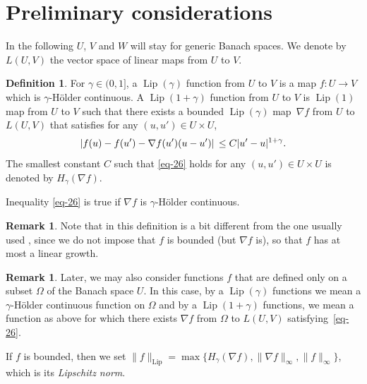 \documentclass[a4paper,12pt]{article}
\theoremstyle{definition}
\newtheorem{definition}{Definition}
\newtheorem{remark}[theorem]{Remark}
\DeclareMathOperator{\Lip}{Lip}
\begin{document}
\section{Preliminary considerations}
\label{sec:prelim}
In the following $U$, $V$ and $W$ will stay for generic Banach spaces.
We denote by $L(U,V)$ the vector space of linear maps from $U$ to $V$.

\begin{definition}
\label{def-1}
For $\gamma\in(0,1]$, a $\Lip(\gamma)$ function from $U$ to $V$
is a map $f:U\to V$ which is $\gamma$-Hölder continuous.
A $\Lip(1+\gamma)$ function from $U$ to $V$ is
$\Lip(1)$ map from $U$ to $V$ such that 
there exists a bounded  $\Lip(\gamma)$  map~$\nabla f$ from $U$ to $L(U,V)$ that satisfies
for any $(u,u')\in U\times U$,
\begin{equation}
\label{eq-26}
\left|f(u)-f(u')-\nabla f(u')(u-u')\right|\\
\leq C|u'-u|^{1+\gamma}.
\end{equation}
The smallest constant $C$ such that \eqref{eq-26} holds for
any $(u,u')\in U\times U$ is denoted by $H_\gamma(\nabla f)$.
\end{definition}

Inequality \eqref{eq-26} is true if $\nabla f$ is $\gamma$-Hölder
continuous.

\begin{remark}
Note that in this definition is a bit different from the one usually used \cites{stein70a,lyons98a,lyons02b},
since we do not impose that $f$ is bounded (but $\nabla f$ is), 
so that $f$ has at most a linear growth.
\end{remark}

\begin{remark}
Later, we may also consider functions $f$ that are defined only on a subset 
$\Omega$ of the Banach space $U$. In this case, by a $\Lip(\gamma)$ functions
we mean a $\gamma$-H\"older continuous function on $\Omega$ and 
by a $\Lip(1+\gamma)$ functions, we mean a function as above for which there exists
$\nabla f$ from $\Omega$ to $L(U,V)$ satisfying~\eqref{eq-26}.
\end{remark}

If $f$ is bounded, then we set 
$\|f\|_{\Lip}=\max\{H_\gamma(\nabla f),\|\nabla f\|_{\infty},\|f\|_{\infty}\}$, 
which is its \emph{Lipschitz norm}.
\end{document}
